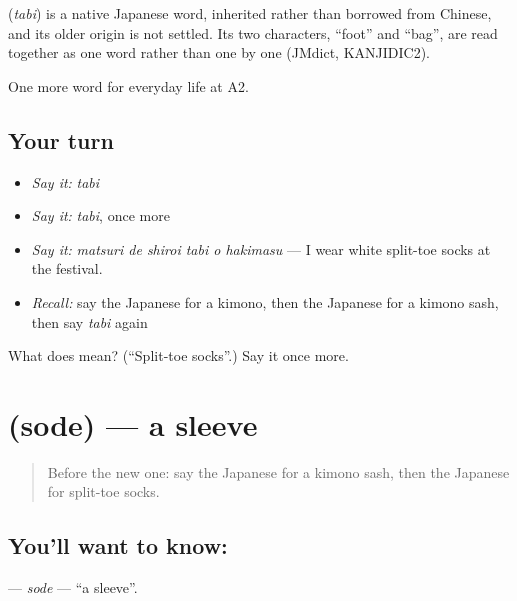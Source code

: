 \begin{cousinweb}
\textbf{} (\emph{tabi}) is a native Japanese word, inherited rather than borrowed from Chinese, and its older origin is not settled. Its two characters, \textquotedblleft{}foot\textquotedblright{} and \textquotedblleft{}bag\textquotedblright{}, are read together as one word rather than one by one (JMdict, KANJIDIC2).
\end{cousinweb}

\begin{grammarlens}[title={What you've built}]
One more word for everyday life at A2.
\end{grammarlens}

\subsection*{Your turn}
\begin{itemize}
\raggedright
  \item \emph{Say it:} \emph{tabi}
  \item \emph{Say it:} \emph{tabi}, once more
  \item \emph{Say it:} \emph{matsuri de shiroi tabi o hakimasu} — I wear white split-toe socks at the festival.
  \item \emph{Recall:} say the Japanese for a kimono, then the Japanese for a kimono sash, then say \emph{tabi} again
\end{itemize}

\begin{tcolorbox}[breakable,colback=teal!4,colframe=teal!35!black,title={Before you move on}]
What does  mean? (\textquotedblleft{}Split-toe socks\textquotedblright{}.) Say it once more.
\end{tcolorbox}
\section[\texorpdfstring{\ja{そで} (sode)}{そで (sode)}]{ (sode) — a sleeve}

\label{lesson:JA-C151-sode}



\begin{quote}
Before the new one: say the Japanese for a kimono sash, then the Japanese for split-toe socks.
\end{quote}

\subsection*{You'll want to know: }
\textbf{} — \emph{sode} — \textquotedblleft{}a sleeve\textquotedblright{}.

